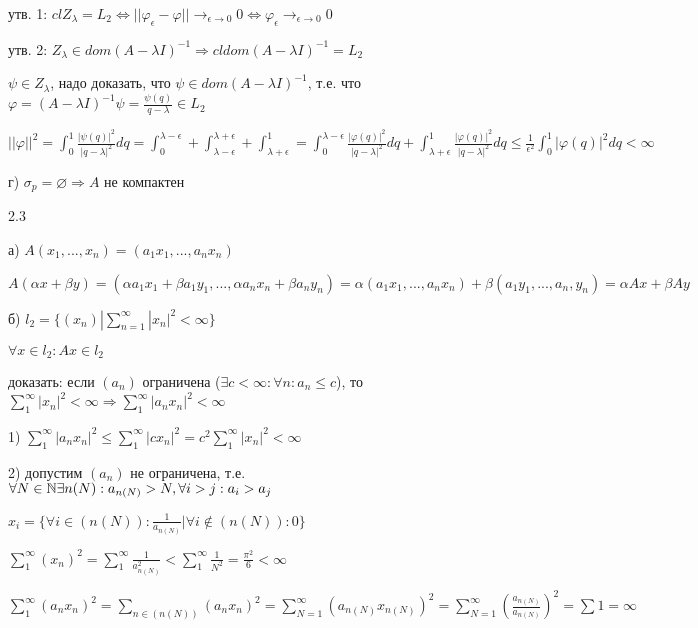 \documentclass[russian]{article}
\begin{document}
утв. 1: $cl Z_\lambda = L_2 \Leftrightarrow ||\varphi_\epsilon - \varphi || \rightarrow _ {\epsilon \rightarrow 0} 0 \Leftrightarrow \varphi_ \epsilon \rightarrow _{\epsilon \rightarrow 0} 0$

утв. 2: $Z_\lambda \in dom(A-\lambda I)^{-1} \Rightarrow cl dom (A-\lambda I)^{-1} = L_2$

$\psi \in Z_\lambda$, надо доказать, что $\psi \in dom (A-\lambda I)^{-1}$, т.е. что $\varphi = (A-\lambda I)^{-1}\psi=\frac{\psi(q)}{q-\lambda} \in L_2$

$||\varphi||^2 = \int_0^1\frac{|\psi(q)|^2}{|q-\lambda|^2}dq = \int_0^{\lambda - \epsilon} + \int_{\lambda - \epsilon}^{\lambda + \epsilon} + \int_{\lambda + \epsilon}^1=\int_0^{\lambda - \epsilon}\frac{|\varphi(q)|^2}{|q-\lambda|^2}dq+\int_{\lambda + \epsilon}^1\frac{|\varphi(q)|^2}{|q-\lambda|^2}dq\le\frac{1}{\epsilon^2}\int_0^1|\varphi(q)|^2dq<\infty$

г) $\sigma_p = \varnothing \Rightarrow A$ не компактен

2.3

а) $A(x_1, ..., x_n) = (a_1 x_1, ..., a_n x_n)$

$A(\alpha x + \beta y) = (\alpha a_1 x_1 + \beta a_1 y_1, ..., \alpha a_n x_n + \beta a_n y_n) = \alpha (a_1 x_1, ..., a_n x_n) + \beta (a_1 y_1, ..., a_n, y_n) = \alpha A x + \beta A y$

б) $l_2 = \{ (x_n) | \sum_{n=1}^{\infty}|x_n|^2<\infty \}$

$\forall x \in l_2 : Ax \in l_2 $

доказать: если $(a_n)$ ограничена ($\exists c < \infty : \forall n : a_n \le c $), то $\sum_1^\infty |x_n|^2 < \infty \Rightarrow \sum_1^\infty  |a_n x_n| ^2 < \infty$

1) $ \sum_1^\infty  |a_n x_n| ^2 \le \sum_1^\infty  |c x_n| ^2 = c^2 \sum_1^\infty |x_n| ^2 < \infty$

2) допустим $(a_n)$ не ограничена, т.е. $\forall N \in \Bbb N \exists n(N) : a_{n(N)} > N, \forall i>j : a_i>a_j $

$x_i = \{ \forall i \in (n(N)) : \frac{1}{a_{n(N)}} | \forall i \notin (n(N)) : 0 \}$

$ \sum _1^\infty (x_n)^2 = \sum _1^\infty \frac{1}{a_{n(N)}^2} < \sum _1^\infty \frac{1}{N^2} = \frac{\pi^2}{6} < \infty $

$ \sum _1^\infty (a_n x_n)^2 = \sum _{n\in(n(N))} (a_n x_n)^2 = \sum _{N=1}^\infty (a_{n(N)} x_{n(N)})^2 = \sum _{N=1}^\infty (\frac{a_{n(N)}}{a_{n(N)}})^2 = \sum 1 = \infty $
\end{document}
